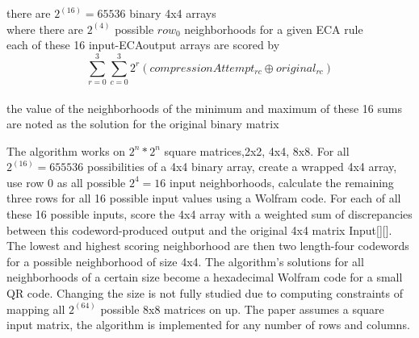 \documentclass[11pt]{article}
\begin{document}
\begin{center}
there are $2^(16)=65536$ binary 4x4 arrays\\
 where there are $2^(4)$ possible $row_0$ neighborhoods for a given ECA rule\\
 each of these 16 input-ECAoutput arrays are scored by\\
\[  \sum_{r=0}^{3} \sum_{c=0}^{3} 2^r ( compressionAttempt_{r c} \oplus original_{r c}) \]\\
 the value of the neighborhoods of the minimum and maximum of these 16 sums \\
 are noted as the solution for the original binary matrix  \\
\end{center}
The algorithm works on $2^n*2^n$ square matrices,2x2, 4x4, 8x8. For all $2^(16)=655536$ possibilities of a 4x4 binary array, create a wrapped 4x4 array, use row 0 as all possible $2^4=16$ input neighborhoods, calculate the remaining three rows for all 16 possible input values using a Wolfram code. For each of all these 16 possible inputs, score the 4x4 array with a weighted sum of discrepancies between this codeword-produced output and the original 4x4 matrix Input[][]. The lowest and highest scoring neighborhood are then two length-four codewords for a possible neighborhood of size 4x4. The algorithm's solutions for all neighborhoods of a certain size become a hexadecimal Wolfram code for a small QR code. Changing the size is not fully studied due to computing constraints of mapping all $2^(64)$ possible 8x8 matrices on up. The paper assumes a square input matrix, the algorithm is implemented for any number of rows and columns. \\
\end{document}
